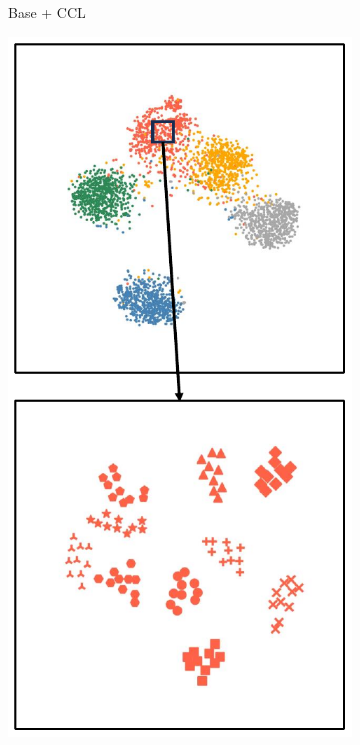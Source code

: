 \begin{figure}[h!]
\begin{subfigure}{0.24\columnwidth}
    \caption{Base + CCL}
    \label{figure3: t-SNE Base + CCL}
    \end{subfigure}
    \begin{subfigure}{0.24\columnwidth}
    \includegraphics[width=\columnwidth]{figures/MGSRCL/t-SNE/Ours.pdf}

\end{subfigure}
\end{figure}
